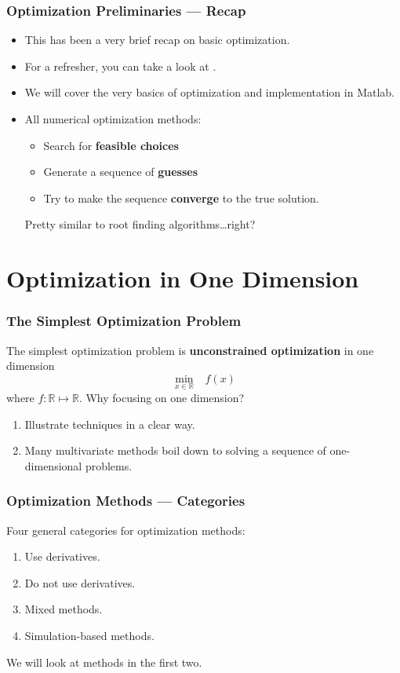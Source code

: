\documentclass[11pt,xcolor={svgnames},aspectratio=169,usepdftitle=false,notheorems]{beamer}
\begin{document}
\begin{frame}
  \frametitle{Optimization Preliminaries --- Recap}
\begin{itemize}
  \item This has been a very brief recap on basic optimization.
  \item For a refresher, you can take a look at \cite[Chapters~17-19]{simon1994mathematics}.
  \item We will cover the very basics of optimization and implementation in Matlab.
  \item All numerical optimization methods:
  \begin{itemize}
    \item Search for \alert{\textbf{feasible choices}}
    \item Generate a sequence of \alert{\textbf{guesses}}
    \item Try to make the sequence \alert{\textbf{converge}} to the true solution.
  \end{itemize}
  {\tiny Pretty similar to root finding algorithms\ldots right?}
\end{itemize}
\end{frame}

\section{Optimization in One Dimension}

\begin{frame}
  \frametitle{The Simplest Optimization Problem}

The simplest optimization problem is \alert{\textbf{unconstrained optimization}} in one dimension
\[
\underset{x\in\mathbb{R}}{\min} \phantom{\Omega} f(x)
\]
where $f : \mathbb{R}\mapsto\mathbb{R}$.
Why focusing on one dimension?
\begin{enumerate}
  \item Illustrate techniques in a clear way.
  \item Many multivariate methods boil down to solving a sequence of one-dimensional problems.
\end{enumerate}
\end{frame}

\begin{frame}
  \frametitle{Optimization Methods --- Categories}
Four general categories for optimization methods:
\begin{enumerate}
  \item Use derivatives.
  \item Do not use derivatives.
  \item Mixed methods.
  \item Simulation-based methods.
\end{enumerate}

We will look at methods in the first two.
\end{frame}
\end{document}
